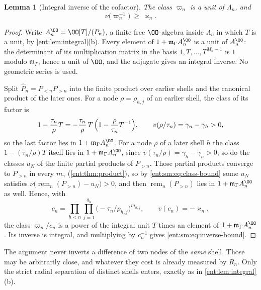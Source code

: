 \documentclass[11pt]{article}
\theoremstyle{plain}
\newtheorem{lemma}[lemma]{Lemma}
\theoremstyle{plain}
\theoremstyle{plain}
\theoremstyle{definition}
\theoremstyle{definition}
\theoremstyle{definition}
\theoremstyle{definition}
\theoremstyle{remark}
\newcommand{\mm}{\mathfrak m_\Gamma}
\DeclareMathOperator{\remp}{rem}\DeclareMathOperator{\Res}{Res}
\begin{document}
\begin{lemma}[Integral inverse of the cofactor]\label{ent:sm:lem:inverse-shell}
The class $\varpi_n$ is a unit of $\Lambda_n$, and
\begin{equation}\label{ent:sm:eq:inverse-bound}
 \nu\bigl(\varpi_n^{-1}\bigr)\ \ge\ \varkappa_n .
\end{equation}
\end{lemma}
\begin{proof}
Write $A_n^{\OO}=\OO[T]/(P_n)$, a finite free $\OO$-algebra inside
$\Lambda_n$ in which $T$ is a unit, by \cref{ent:lem:integral}(b). Every
element of $1+\mm A_n^{\OO}$ is a unit of $A_n^{\OO}$: the determinant of
its multiplication matrix in the basis $1,T,\ldots,T^{M_n-1}$ is $1$ modulo
$\mm$, hence a unit of $\OO$, and the adjugate gives an integral inverse. No
geometric series is used.

Split $\widehat P_n=P_{<n}P_{>n}$ into the finite product over earlier shells
and the canonical product of the later ones. For a node $\rho=\rho_{h,j}$ of
an earlier shell, the class of its factor is
\[
 1-\frac{\tau_n}{\rho}T
 =-\frac{\tau_n}{\rho}\,T\,\Bigl(1-\frac{\rho}{\tau_n}T^{-1}\Bigr),
 \qquad v(\rho/\tau_n)=\gamma_n-\gamma_h>0,
\]
so the last factor lies in $1+\mm A_n^{\OO}$. For a node $\rho$ of a later
shell $h$ the class $1-(\tau_n/\rho)T$ itself lies in $1+\mm A_n^{\OO}$,
since $v(\tau_n/\rho)=\gamma_h-\gamma_n>0$; so do the classes $u_N$ of the
finite partial products of $P_{>n}$. Those partial products converge to
$P_{>n}$ in every $m_\gamma$ (\cref{ent:thm:product}), so by
\eqref{ent:sm:eq:class-bound} some $u_N$ satisfies
$\nu\bigl(\remp_n(P_{>n})-u_N\bigr)>0$, and then $\remp_n(P_{>n})$ lies in
$1+\mm A_n^{\OO}$ as well. Hence, with
\[
 c_n=\prod_{h<n}\prod_{j=1}^{q_h}\bigl(-\tau_n/\rho_{h,j}\bigr)^{m_{h,j}},
 \qquad v(c_n)=-\varkappa_n,
\]
the class $\varpi_n/c_n$ is a power of the integral unit $T$ times an element
of $1+\mm A_n^{\OO}$. Its inverse is integral, and multiplying by
$c_n^{-1}$ gives \eqref{ent:sm:eq:inverse-bound}.
\end{proof}

The argument never inverts a difference of two nodes of the \emph{same}
shell. Those may be arbitrarily close, and whatever they cost is already
measured by $R_n$. Only the strict radial separation of distinct shells
enters, exactly as in \cref{ent:lem:integral}(b).
\end{document}
